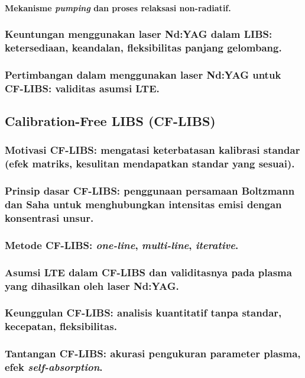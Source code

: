 \paragraph{Mekanisme \textit{pumping} dan proses relaksasi non-radiatif.}

\subsubsection{Keuntungan menggunakan laser Nd:YAG dalam LIBS: ketersediaan, keandalan, fleksibilitas panjang gelombang.}
\subsubsection{Pertimbangan dalam menggunakan laser Nd:YAG untuk CF-LIBS: validitas asumsi LTE.}


\subsection{Calibration-Free LIBS (CF-LIBS)}

\subsubsection{Motivasi CF-LIBS: mengatasi keterbatasan kalibrasi standar (efek matriks, kesulitan mendapatkan standar yang sesuai).}
\subsubsection{Prinsip dasar CF-LIBS: penggunaan persamaan Boltzmann dan Saha untuk menghubungkan intensitas emisi dengan konsentrasi unsur.}
\subsubsection{Metode CF-LIBS: \textit{one-line}, \textit{multi-line}, \textit{iterative}.}
\subsubsection{Asumsi LTE dalam CF-LIBS dan validitasnya pada plasma yang dihasilkan oleh laser Nd:YAG.}
\subsubsection{Keunggulan CF-LIBS: analisis kuantitatif tanpa standar, kecepatan, fleksibilitas.}
\subsubsection{Tantangan CF-LIBS: akurasi pengukuran parameter plasma, efek \textit{self-absorption}.}


